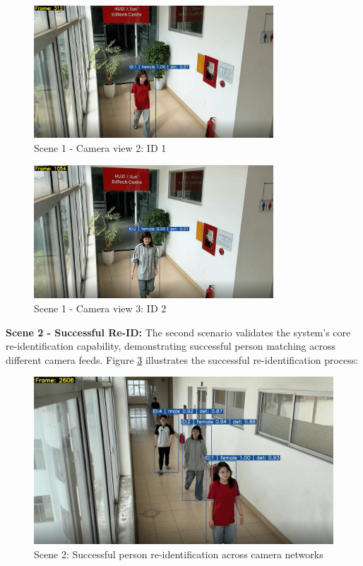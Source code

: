 \begin{figure}[htbp]
    \centering
    \includegraphics[width=0.8\textwidth]{Figure/ngas1.png}
    \caption{Scene 1 - Camera view 2: ID 1}
    \label{fig:ngas1}
\end{figure}

\begin{figure}[htbp]
    \centering
    \includegraphics[width=0.8\textwidth]{Figure/tuyens1.png}
    \caption{Scene 1 - Camera view 3: ID 2}
    \label{fig:tuyens1}
\end{figure}

\newpage

\textbf{Scene 2 - Successful Re-ID:}
The second scenario validates the system's core re-identification capability, demonstrating successful person matching across different camera feeds. Figure \ref{fig:scene2_results} illustrates the successful re-identification process:

\begin{figure}[htbp]
    \centering
    \includegraphics[width=1\textwidth]{Figure/s2.png}
    \caption{Scene 2: Successful person re-identification across camera networks}
    \label{fig:scene2_results}
\end{figure}

